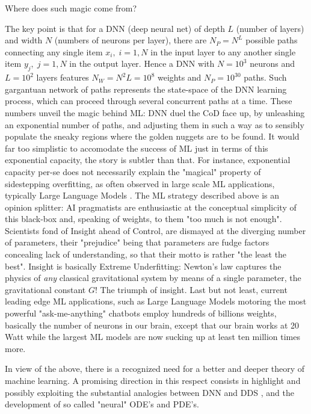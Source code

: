 \documentclass[15pt]{article}
\begin{document}
Where does such magic come from?

The key point is that for a DNN (deep neural net) of depth $L$
(number of layers) and width $N$ (numbers of neurons
per layer), there are $N_P=N^L$ possible paths connecting any 
single item $x_i, \; i=1,N$ in the input layer to any another 
single item $y_j, \;j=1,N$ in the output layer.
Hence a DNN with $N=10^3$ neurons and $L=10^2$ layers features
$N_W = N^2 L=10^8$ weights and $N_P=10^{30}$ paths.
Such gargantuan network of paths represents the state-space
of the DNN learning process, which can proceed through several
concurrent paths at a time. 
These numbers unveil the magic behind ML: DNN duel the 
CoD face up, by unleashing an exponential number of paths, and
adjusting them in such a way as to sensibly populate the 
sneaky regions where the golden nuggets are to be found.
It would far too simplistic to accomodate the success of ML just
in terms of this exponential capacity, the story is subtler than that.
For instance, exponential capacity per-se does not necessarily
explain the "magical" property of sidestepping overfitting, as often observed
in large scale ML applications, typically Large Language Models \cite{GOOGLE}. 
The ML strategy described above is an opinion splitter: AI pragmatists 
are enthusiastic at the conceptual simplicity of this black-box and, 
speaking of weights, to them  "too much is not enough". 
Scientists fond of Insight ahead of Control, are 
dismayed at the diverging number of parameters, 
their "prejudice" being that parameters are fudge factors
concealing lack of understanding, so that their motto
is rather "the least the best". 
Insight is basically Extreme Underfitting: Newton's law captures
the physics of {\it any} classical gravitational system by means 
of a single parameter, the gravitational constant $G$!
The triumph of insight. 
Last but not least, current leading edge ML applications, such  
as Large Language Models motoring the most powerful "ask-me-anything" chatbots
employ hundreds of billions weights, basically the number
of neurons in our brain, except that our brain works at 20 Watt 
while the largest ML models are now sucking up at least ten million times more. 

In view of the above, there is a recognized need
for a better and deeper theory of machine learning. 
A promising direction in this respect consists in highlight and possibly exploiting the
substantial analogies between DNN and DDS \cite{E1,E2,E3},
and the development of so called "neural" ODE's and PDE's.  
\end{document}
